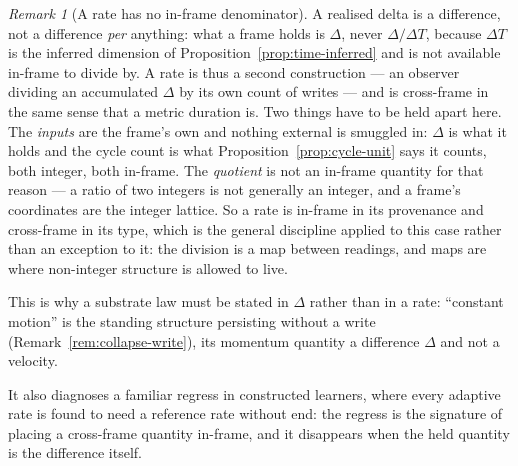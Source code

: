 \documentclass[11pt,a4paper]{article}
\theoremstyle{remark}\newtheorem{remark}[definition]{Remark}
\begin{document}
\begin{remark}[A rate has no in-frame denominator]\label{rem:no-denominator}
A realised delta is a difference, not a difference \emph{per} anything: what a frame holds is $\Delta$, never $\Delta/\Delta T$, because $\Delta T$ is the inferred dimension of Proposition~\ref{prop:time-inferred} and is not available in-frame to divide by. A rate is thus a second construction --- an observer dividing an accumulated $\Delta$ by its own count of writes --- and is cross-frame in the same sense that a metric duration is. Two things have to be held apart here. The \emph{inputs} are the frame's own and nothing external is smuggled in: $\Delta$ is what it holds and the cycle count is what Proposition~\ref{prop:cycle-unit} says it counts, both integer, both in-frame. The \emph{quotient} is not an in-frame quantity for that reason --- a ratio of two integers is not generally an integer, and a frame's coordinates are the integer lattice. So a rate is in-frame in its provenance and cross-frame in its type, which is the general discipline applied to this case rather than an exception to it: the division is a map between readings, and maps are where non-integer structure is allowed to live.

This is why a substrate law must be stated in $\Delta$ rather than in a rate: ``constant motion'' is the standing structure persisting without a write (Remark~\ref{rem:collapse-write}), its momentum quantity a difference $\Delta$ and not a velocity.

It also diagnoses a familiar regress in constructed learners, where every adaptive rate is found to need a reference rate without end: the regress is the signature of placing a cross-frame quantity in-frame, and it disappears when the held quantity is the difference itself.
\end{remark}
\end{document}
